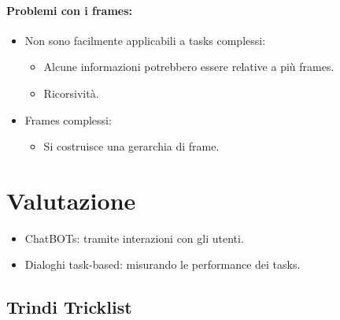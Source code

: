 \paragraph{Problemi con i frames:}

\begin{itemize}
  \item Non sono facilmente applicabili a tasks complessi: 
    \begin{itemize}
      \item Alcune informazioni potrebbero essere relative a più frames. 
      \item Ricorsività. 
    \end{itemize}
  \item Frames complessi: 
    \begin{itemize}
      \item Si costruisce una gerarchia di frame. 
    \end{itemize}
\end{itemize}


\section{Valutazione}


\begin{itemize}
  \item ChatBOTs: tramite interazioni con gli utenti. 
  \item Dialoghi task-based: misurando le performance dei tasks.
\end{itemize}

\subsection{Trindi Tricklist}

